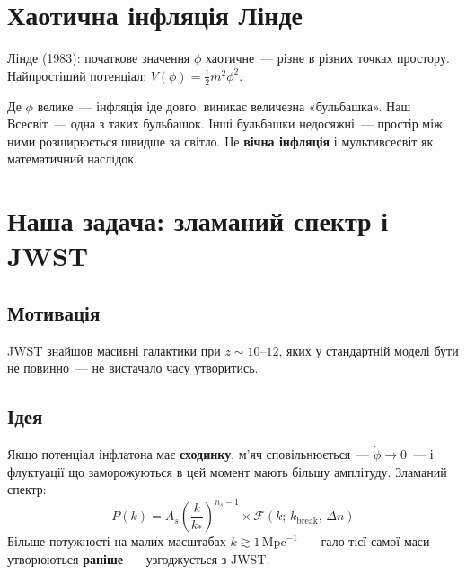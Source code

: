 \documentclass[12pt, a4paper]{article}
\begin{document}
\section{Хаотична інфляція Лінде}

Лінде (1983): початкове значення $\phi$ хаотичне~--- різне в різних точках простору.
Найпростіший потенціал: $V(\phi) = \frac{1}{2}m^2\phi^2$.

Де $\phi$ велике~--- інфляція іде довго, виникає величезна «бульбашка».
Наш Всесвіт~--- одна з таких бульбашок. Інші бульбашки недосяжні~---
простір між ними розширюється швидше за світло.
Це \textbf{вічна інфляція} і мультивсесвіт як математичний наслідок.

\section{Наша задача: зламаний спектр і JWST}

\subsection{Мотивація}

JWST знайшов масивні галактики при $z \sim 10$--$12$, яких у стандартній
моделі бути не повинно~--- не вистачало часу утворитись.

\subsection{Ідея}

Якщо потенціал інфлатона має \textbf{сходинку}, м'яч сповільнюється~---
$\dot{\phi} \to 0$~--- і флуктуації що заморожуються в цей момент мають
більшу амплітуду. Зламаний спектр:
\begin{equation*}
  P(k) = A_s \left(\frac{k}{k_*}\right)^{n_s-1}
  \times \mathcal{F}(k;\, k_\mathrm{break},\, \Delta n)
\end{equation*}
Більше потужності на малих масштабах $k \gtrsim 1\,\mathrm{Mpc}^{-1}$~---
гало тієї самої маси утворюються \textbf{раніше}~--- узгоджується з JWST.

\end{document}
